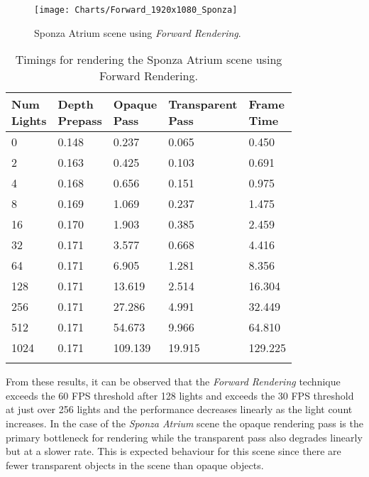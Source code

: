 \begin{figure}[H]
\centering
\texttt{[image: Charts/Forward\_1920x1080\_Sponza]}
\decoRule
\caption{Sponza Atrium scene using \emph{Forward Rendering}.}
\label{fig:Forward_1920x1080_Sponza}
\end{figure}

\begin{table}[H]
\caption{Timings for rendering the Sponza Atrium scene using Forward Rendering.}
\label{tab:Forward_1920x1080_Sponza}
\centering
\begin{tabular}{*{5}{l}}
\toprule
\thead{Num \\Lights} & \thead{Depth \\Prepass} & \thead{Opaque \\Pass} & \thead{Transparent \\Pass} & \thead{Frame \\Time } \\
\midrule
0 & 0.148 & 0.237 & 0.065 & 0.450 \\
2 & 0.163 & 0.425 & 0.103 & 0.691 \\
4 & 0.168 & 0.656 & 0.151 & 0.975 \\
8 & 0.169 & 1.069 & 0.237 & 1.475 \\
16 & 0.170 & 1.903 & 0.385 & 2.459 \\
32 & 0.171 & 3.577 & 0.668 & 4.416 \\
64 & 0.171 & 6.905 & 1.281 & 8.356 \\
128 & 0.171 & 13.619 & 2.514 & 16.304 \\
256 & 0.171 & 27.286 & 4.991 & 32.449 \\
512 & 0.171 & 54.673 & 9.966 & 64.810 \\
1024 & 0.171 & 109.139 & 19.915 & 129.225 \\
\bottomrule\\
\end{tabular}
\end{table}

From these results, it can be observed that the \emph{Forward Rendering} technique exceeds the 60 FPS threshold after 128 lights and exceeds the 30 FPS threshold at just over 256 lights and the performance decreases linearly as the light count increases. In the case of the \emph{Sponza Atrium} scene the opaque rendering pass is the primary bottleneck for rendering while the transparent pass also degrades linearly but at a slower rate. This is expected behaviour for this scene since there are fewer transparent objects in the scene than opaque objects.

